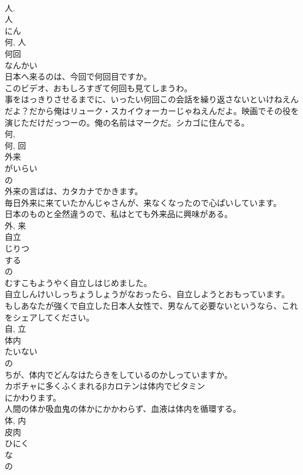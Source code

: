 \documentclass[8pt]{extreport}
\begin{document}
\begin{CJK}{UTF8}{min}
\\	人. 
\\	人 
\\	にん 
\\	何, 人	
\\	何回	
\\	なんかい	
\\	日本へ来るのは、今回で何回目ですか。	
\\	このビデオ、おもしろすぎて何回も見てしまうわ。	
\\	事をはっきりさせるまでに、いったい何回この会話を繰り返さないといけねえんだよ？だから俺はリューク・スカイウォーカーじゃねえんだよ。映画でその役を演じただけだっつーの。俺の名前はマークだ。シカゴに住んでる。	
\\	何, 
\\	何, 回	
\\	外来	
\\	がいらい	
\\	の 
\\	外来の言ばは、カタカナでかきます。	
\\	毎日外来に来ていたかんじゃさんが、来なくなったので心ぱいしています。	
\\	日本のものと全然違うので、私はとても外来品に興味がある。	
\\	外, 来	
\\	自立	
\\	じりつ	
\\	する 
\\	の 
\\	むすこもようやく自立しはじめました。	
\\	自立しんけいしっちょうしょうがなおったら、自立しようとおもっています。	
\\	もしあなたが強くで自立した日本人女性で、男なんて必要ないというなら、これをシェアしてください。	
\\	自, 立	
\\	体内	
\\	たいない	
\\	の 
\\	ちが、体内でどんなはたらきをしているのかしっていますか。	
\\	カボチャに多くふくまれるβカロテンは体内でビタミン
\\	にかわります。	
\\	人間の体か吸血鬼の体かにかかわらず、血液は体内を循環する。	
\\	体, 内	
\\	皮肉	
\\	ひにく	
\\	な 
\\	の 

\end{CJK}
\end{document}
